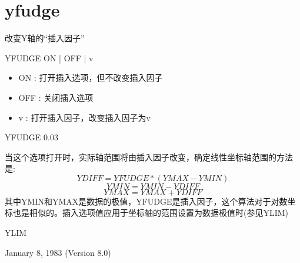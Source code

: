 \section{yfudge}
\label{cmd:yfudge}

改变Y轴的``插入因子''

YFUDGE ON | OFF | v

\begin{itemize}
\item ON : 打开插入选项，但不改变插入因子 
\item OFF : 关闭插入选项 
\item v : 打开插入因子，改变插入因子为v 
\end{itemize}

YFUDGE 0.03

当这个选项打开时，实际轴范围将由插入因子改变，确定线性坐标轴范围的方法是:
\[ YDIFF=YFUDGE*(YMAX-YMIN) \]
\[ YMIN=YMIN-YDIFF \]
\[ YMAX=YMAX+YDIFF \]
其中YMIN和YMAX是数据的极值，YFUDGE是插入因子，这个算法对于对数坐标也是相似的。插入选项值应用于坐标轴的范围设置为数据极值时(参见YLIM)

YLIM

January 8, 1983 (Version 8.0)
